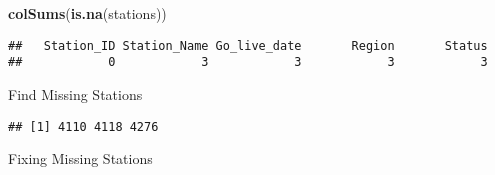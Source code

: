 \documentclass[]{article}
\newenvironment{Shaded}{\begin{snugshade}}{\end{snugshade}}
\newcommand{\KeywordTok}[1]{\textcolor[rgb]{0.13,0.29,0.53}{\textbf{#1}}}
\newcommand{\ControlFlowTok}[1]{\textcolor[rgb]{0.13,0.29,0.53}{\textbf{#1}}}
\newcommand{\OperatorTok}[1]{\textcolor[rgb]{0.81,0.36,0.00}{\textbf{#1}}}
\newcommand{\NormalTok}[1]{#1}
\begin{document}
\begin{Shaded}
\begin{Highlighting}[]
\KeywordTok{colSums}\NormalTok{(}\KeywordTok{is.na}\NormalTok{(stations))}
\end{Highlighting}
\end{Shaded}

\begin{verbatim}
##   Station_ID Station_Name Go_live_date       Region       Status 
##            0            3            3            3            3
\end{verbatim}

Find Missing Stations

\begin{Shaded}
\end{Shaded}

\begin{verbatim}
## [1] 4110 4118 4276
\end{verbatim}

Fixing Missing Stations
\end{document}
